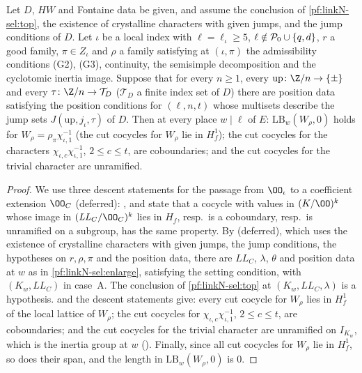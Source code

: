 \begin{proposition}\label{pf:linkN-sel:useloc}
Let $D$, $HW$ and Fontaine data be given, and assume the conclusion of \cref{pf:linkN-sel:top}, the existence of crystalline characters with given
jumps, and the jump conditions of $D$. Let $\iota$ be a local index with $\ell=\ell_\iota\ge5$, $\ell\notin\mathcal P_0\cup\{q,d\}$, $r$ a good family,
$\pi\in Z_\iota$ and $\rho$ a family satisfying at $(\iota,\pi)$ the admissibility conditions (G2), (G3), continuity, the semisimple decomposition and
the cyclotomic inertia image. Suppose that for every $n\ge1$, every $\mathrm{up}\colon\Z/n\to\{\pm\}$ and every $\tau\colon\Z/n\to\mathcal T_D$
($\mathcal T_D$ a finite index set of $D$) there are position data satisfying the position conditions for $(\ell,n,t)$ whose multisets describe the
jump sets $J(\mathrm{up},j_\iota,\tau)$ of $D$. Then at every place $w\mid\ell$ of $E$: $\mathrm{LB}_w(W_\rho,0)$ holds for
$W_\rho=\rho_\pi\chi_{\iota,1}^{-1}$ (the cut cocycles for $W_\rho$ lie in $H^1_f$); the cut cocycles for the characters
$\chi_{\iota,c}\chi_{\iota,1}^{-1}$, $2\le c\le t$, are coboundaries; and the cut cocycles for the trivial character are unramified.
\end{proposition}

\begin{proof}
We use three descent statements for the passage from $\OO_\iota$ to a coefficient extension $\OO_C$ (deferred):
,  and
 state that a cocycle with values in $(K/\OO)^k$ whose image in
$(\mathit{LL}_C/\OO_C)^k$ lies in $H_f$, resp.\ is a coboundary, resp.\ is unramified on a subgroup, has the same property. By
 (deferred), which uses the existence of crystalline characters with given
jumps, the jump conditions, the hypotheses on $r,\rho,\pi$ and the position data, there are $\mathit{LL}_C$, $\lambda$, $\theta$ and position
data at $w$ as in \cref{pf:linkN-sel:enlarge}, satisfying the setting condition, with $(K_w,\mathit{LL}_C)$ in case~A. The conclusion of
\cref{pf:linkN-sel:top} at $(K_w,\mathit{LL}_C,\lambda)$ is a hypothesis.  and the descent statements give: every cut
cocycle for $W_\rho$ lies in $H^1_f$ of the local lattice of $W_\rho$; the cut cocycles for $\chi_{\iota,c}\chi_{\iota,1}^{-1}$, $2\le c\le t$, are
coboundaries; and the cut cocycles for the trivial character are unramified on $I_{K_w}$, which is the inertia group at $w$
(). Finally, since all cut cocycles for $W_\rho$ lie in $H^1_f$, so does their span, and the length
in $\mathrm{LB}_w(W_\rho,0)$ is $0$.
\end{proof}

